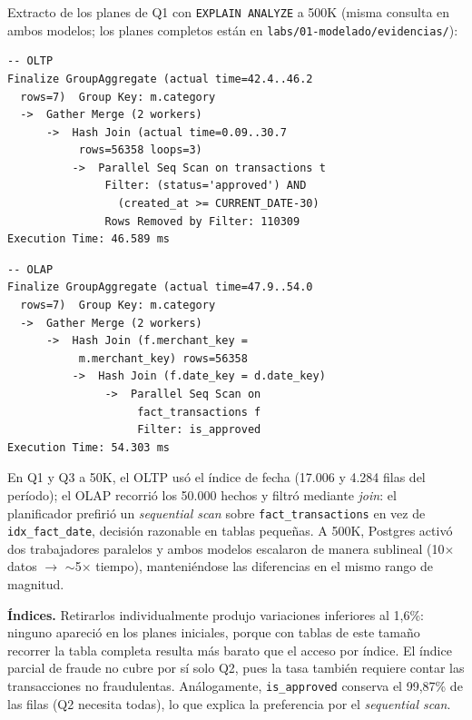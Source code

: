 \documentclass[10pt]{article}
\begin{document}
Extracto de los planes de Q1 con \texttt{EXPLAIN ANALYZE} a 500K (misma consulta en ambos modelos; los planes completos están en \texttt{labs/01-modelado/evidencias/}):

\vspace{2pt}
{\footnotesize
\begin{minipage}[t]{0.485\textwidth}
\begin{verbatim}
-- OLTP
Finalize GroupAggregate (actual time=42.4..46.2
  rows=7)  Group Key: m.category
  ->  Gather Merge (2 workers)
      ->  Hash Join (actual time=0.09..30.7
           rows=56358 loops=3)
          ->  Parallel Seq Scan on transactions t
               Filter: (status='approved') AND
                 (created_at >= CURRENT_DATE-30)
               Rows Removed by Filter: 110309
Execution Time: 46.589 ms
\end{verbatim}
\end{minipage}\hfill
\begin{minipage}[t]{0.485\textwidth}
\begin{verbatim}
-- OLAP
Finalize GroupAggregate (actual time=47.9..54.0
  rows=7)  Group Key: m.category
  ->  Gather Merge (2 workers)
      ->  Hash Join (f.merchant_key =
           m.merchant_key) rows=56358
          ->  Hash Join (f.date_key = d.date_key)
               ->  Parallel Seq Scan on
                    fact_transactions f
                    Filter: is_approved
Execution Time: 54.303 ms
\end{verbatim}
\end{minipage}
}

En Q1 y Q3 a 50K, el OLTP usó el índice de fecha (17.006 y 4.284 filas del período); el OLAP recorrió los 50.000 hechos y filtró mediante \emph{join}: el planificador prefirió un \emph{sequential scan} sobre \texttt{fact\_transactions} en vez de \texttt{idx\_fact\_date}, decisión razonable en tablas pequeñas. A 500K, Postgres activó dos trabajadores paralelos y ambos modelos escalaron de manera sublineal (10$\times$ datos $\rightarrow$ $\sim$5$\times$ tiempo), manteniéndose las diferencias en el mismo rango de magnitud.

\textbf{Índices.} Retirarlos individualmente produjo variaciones inferiores al 1,6\%: ninguno apareció en los planes iniciales, porque con tablas de este tamaño recorrer la tabla completa resulta más barato que el acceso por índice. El índice parcial de fraude no cubre por sí solo Q2, pues la tasa también requiere contar las transacciones no fraudulentas. Análogamente, \texttt{is\_approved} conserva el 99,87\% de las filas (Q2 necesita todas), lo que explica la preferencia por el \emph{sequential scan}.
\end{document}
